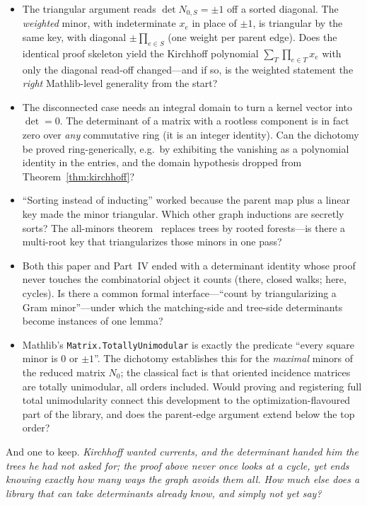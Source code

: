 \documentclass[11pt]{article}
\newcommand{\lean}[1]{\texttt{#1}}
\begin{document}
\begin{itemize}
\item The triangular argument reads $\det N_{0,S}=\pm1$ off a sorted diagonal. The
\emph{weighted} minor, with indeterminate $x_e$ in place of $\pm1$, is triangular by the same
key, with diagonal $\pm\prod_{e\in S}$\,(one weight per parent edge). Does the identical proof
skeleton yield the Kirchhoff polynomial $\sum_T\prod_{e\in T}x_e$ with only the diagonal
read-off changed---and if so, is the weighted statement the \emph{right} Mathlib-level
generality from the start?
\item The disconnected case needs an integral domain to turn a kernel vector into
$\det=0$. The determinant of a matrix with a rootless component is in fact zero over \emph{any}
commutative ring (it is an integer identity). Can the dichotomy be proved ring-generically,
e.g.\ by exhibiting the vanishing as a polynomial identity in the entries, and the domain
hypothesis dropped from Theorem~\ref{thm:kirchhoff}?
\item ``Sorting instead of inducting'' worked because the parent map plus a linear key made the
minor triangular. Which other graph inductions are secretly sorts? The all-minors
theorem~\cite{ChaikenKleitman1978} replaces trees by rooted forests---is there a multi-root key
that triangularizes those minors in one pass?
\item Both this paper and Part~IV ended with a determinant identity whose proof never touches
the combinatorial object it counts (there, closed walks; here, cycles). Is there a common
formal interface---``count by triangularizing a Gram minor''---under which the matching-side
and tree-side determinants become instances of one lemma?
\item Mathlib's \lean{Matrix.TotallyUnimodular} is exactly the predicate ``every square minor
is $0$ or $\pm1$''. The dichotomy establishes this for the \emph{maximal} minors of the reduced
matrix $N_0$; the classical fact is that oriented incidence matrices are totally unimodular,
all orders included. Would proving and registering full total unimodularity connect this
development to the optimization-flavoured part of the library, and does the parent-edge
argument extend below the top order?
\end{itemize}

And one to keep. \emph{Kirchhoff wanted currents, and the determinant handed him the trees he
had not asked for; the proof above never once looks at a cycle, yet ends knowing exactly how
many ways the graph avoids them all. How much else does a library that can take determinants
already know, and simply not yet say?}
\end{document}
